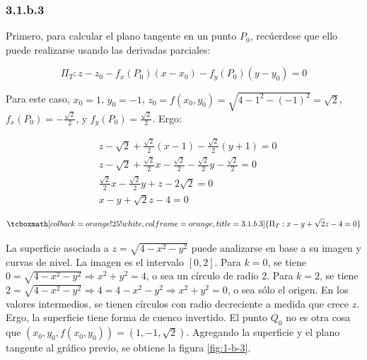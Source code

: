 \documentclass{article}
\begin{document}
\subsubsection*{3.1.b.3}
\label{subsubsec:3.1.b.3}

Primero, para calcular el plano tangente en un punto $P_0$, recúerdese que ello puede realizarse usando las derivadas parciales:

\begin{equation}
\Pi_T: z-z_0 - f_x(P_0) (x-x_0) - f_y(P_0) (y-y_0) = 0
\end{equation}

Para este caso, $x_0 = 1$, $y_0 = -1$, $z_0 = f(x_0,y_0) = \sqrt{4-1^2-(-1)^2} = \sqrt{2}$, $f_x(P_0) = -\frac{\sqrt{2}}{2}$, y $f_y(P_0) = \frac{\sqrt{2}}{2}$. Ergo:

\begin{subequations}
\begin{align}
& z-\sqrt{2} + \frac{\sqrt{2}}{2} (x-1) - \frac{\sqrt{2}}{2} (y+1) = 0 \\
& z-\sqrt{2} + \frac{\sqrt{2}}{2} x -\frac{\sqrt{2}}{2} -\frac{\sqrt{2}}{2}y -\frac{\sqrt{2}}{2} = 0 \\
& \frac{\sqrt{2}}{2} x -\frac{\sqrt{2}}{2} y + z - 2\sqrt{2} = 0 \\
& x -y + \sqrt{2} z -4 = 0
\end{align}
\end{subequations}

\begin{equation}
\tcboxmath[colback=orange!25!white,colframe=orange,title=3.1.b.3]
{
\Pi_T: x - y +\sqrt{2}z -4 = 0
}
\end{equation}

La superficie asociada a $z = \sqrt{4 - x^2 - y^2}$ puede analizarse en base a su imagen y curvas de nivel. La imagen es el intervalo $[0,2]$. Para $k = 0$, se tiene $0 = \sqrt{4 - x^2 - y^2} \Rightarrow x^2 + y^2 = 4$, o sea un círculo de radio 2. Para $k = 2$, se tiene $2 = \sqrt{4 - x^2 -y^2} \Rightarrow 4 = 4 -x^2-y^2 \Rightarrow x^2 + y^2 = 0$, o sea sólo el origen. En los valores intermedios, se tienen círculos con radio decreciente a medida que crece $z$. Ergo, la superficie tiene forma de cuenco invertido. El punto $Q_0$ no es otra cosa que $(x_0, y_0, f(x_0, y_0)) = (1, -1, \sqrt{2})$. Agregando la superficie y el plano tangente al gráfico previo, se obtiene la figura \ref{fig:1-b-3}.
\end{document}
